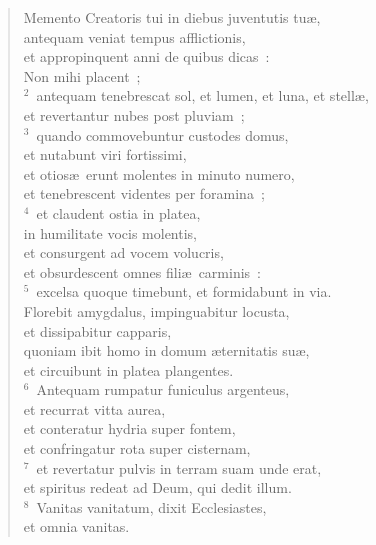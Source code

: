 \begin{flushleft}\begin{verse}\vspace{-19pt}\hspace{6pt}Memento Creatoris tui in diebus juventutis tu\ae ,\\\hspace{6pt} antequam veniat tempus afflictionis,\\ et appropinquent anni de quibus dicas~:\\ Non mihi placent~;\\
${}^{2}$~antequam tenebrescat sol, et lumen, et luna, et stell\ae ,\\ et revertantur nubes post pluviam~;\\
${}^{3}$~quando commovebuntur custodes domus,\\ et nutabunt viri fortissimi,\\ et otios\ae\ erunt molentes in minuto numero,\\ et tenebrescent videntes per foramina~;\\
${}^{4}$~et claudent ostia in platea,\\ in humilitate vocis molentis,\\ et consurgent ad vocem volucris,\\ et obsurdescent omnes fili\ae\ carminis~:\\
${}^{5}$~excelsa quoque timebunt, et formidabunt in via.\\ Florebit amygdalus, impinguabitur locusta,\\ et dissipabitur capparis,\\ quoniam ibit homo in domum \ae ternitatis su\ae ,\\ et circuibunt in platea plangentes.\\
${}^{6}$~Antequam rumpatur funiculus argenteus,\\ et recurrat vitta aurea,\\ et conteratur hydria super fontem,\\ et confringatur rota super cisternam,\\
${}^{7}$~et revertatur pulvis in terram suam unde erat,\\ et spiritus redeat ad Deum, qui dedit illum.\\
${}^{8}$~Vanitas vanitatum, dixit Ecclesiastes,\\ et omnia vanitas.\end{verse}\end{flushleft}


